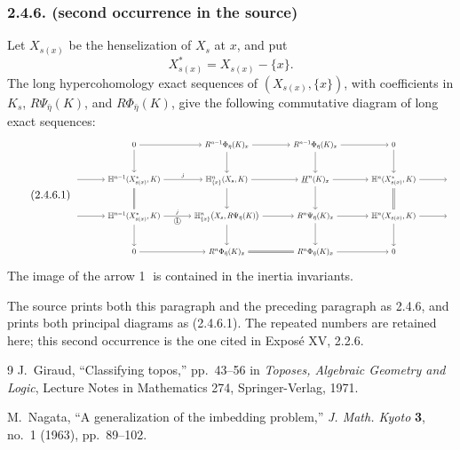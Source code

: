 \subsubsection*{2.4.6. (second occurrence in the source)}
Let $X_{s(x)}$ be the henselization of $X_s$ at $x$, and put
\[
X^*_{s(x)}=X_{s(x)}-\{x\}.
\]
The long hypercohomology exact sequences of
$(X_{s(x)},\{x\})$, with coefficients in $K_s$,
$R\Psi_{\bar\eta}(K)$, and $R\Phi_{\bar\eta}(K)$, give the following
commutative diagram of long exact sequences:
\begin{equation}\tag{2.4.6.1}
\resizebox{\textwidth}{!}{%
\begin{tikzcd}[ampersand replacement=\&, column sep=large, row sep=large]
{}
  \& 0 \arrow[r] \arrow[d]
  \& R^{n-1}\Phi_{\bar\eta}(K)_x \arrow[r] \arrow[d]
  \& R^{n-1}\Phi_{\bar\eta}(K)_x \arrow[r] \arrow[d]
  \& 0 \arrow[d]
  \& {} \\
{} \arrow[r]
  \& \mathbb H^{n-1}(X^*_{s(x)},K)
     \arrow[r, "j"] \arrow[d, equal]
  \& \mathbb H^n_{\{x\}}(X_s,K) \arrow[r] \arrow[d]
  \& \underline{H}^{n}(K)_x \arrow[r] \arrow[d]
  \& \mathbb H^n(X^*_{s(x)},K)
     \arrow[r] \arrow[d, equal]
  \& {} \\
{} \arrow[r]
  \& \mathbb H^{n-1}(X^*_{s(x)},K)
     \arrow[r, "j", "{\mbox{\textcircled{1}}}"'] \arrow[d]
  \& \mathbb H^n_{\{x\}}\bigl(X_s,R\Psi_{\bar\eta}(K)\bigr)
     \arrow[r] \arrow[d]
  \& R^n\Psi_{\bar\eta}(K)_x \arrow[r] \arrow[d]
  \& \mathbb H^n(X_{s(x)},K) \arrow[r] \arrow[d]
  \& {} \\
{}
  \& 0 \arrow[r]
  \& R^n\Phi_{\bar\eta}(K)_x \arrow[r, equal]
  \& R^n\Phi_{\bar\eta}(K)_x \arrow[r]
  \& 0
  \& {}
\end{tikzcd}}
\end{equation}
The image of the arrow \textcircled{1} is contained in the inertia
invariants.

The source prints both this paragraph and the preceding paragraph as
2.4.6, and prints both principal diagrams as (2.4.6.1).  The repeated
numbers are retained here; this second occurrence is the one cited in
Expos\'e XV, 2.2.6.

\renewcommand{\refname}{Bibliography}
\begin{thebibliography}{9}
J.~Giraud, ``Classifying topos,'' pp.~43--56 in
\emph{Toposes, Algebraic Geometry and Logic},
Lecture Notes in Mathematics 274, Springer-Verlag, 1971.

M.~Nagata, ``A generalization of the imbedding problem,''
\emph{J. Math. Kyoto} \textbf{3}, no.~1 (1963), pp.~89--102.
\end{thebibliography}
